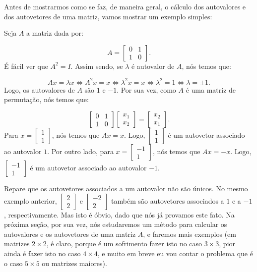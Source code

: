 Antes de mostrarmos como se faz, de maneira geral, o cálculo dos autovalores e dos autovetores de uma matriz, vamos mostrar um exemplo simples:

\begin{Example}
	Seja $A$ a matriz dada por:
	
	$$
	A = \begin{bmatrix}
		0 & 1 \\
		1 & 0
	\end{bmatrix}.
	$$
	É fácil ver que $A^2 = I$. Assim sendo, se $\lambda$ é autovalor de $A$, nós temos que:
	
	$$
	Ax = \lambda x \iff A^2x = x \iff \lambda^2 x = x \iff \lambda^2 = 1 \iff \lambda = \pm 1.
	$$
	Logo, os autovalores de $A$ são $1$ e $-1$. Por sua vez, como $A$ é uma matriz de permutação, nós temos que:
	
	$$
	\begin{bmatrix}
		0 & 1 \\
		1 & 0
	\end{bmatrix}\begin{bmatrix}
		x_1 \\
		x_2
	\end{bmatrix} = \begin{bmatrix}
		x_2 \\
		x_1
	\end{bmatrix}.
	$$
	Para $x = \begin{bmatrix}
		1 \\
		1
	\end{bmatrix}$, nós temos que $Ax = x$. Logo, $\begin{bmatrix}
		1 \\
		1
	\end{bmatrix}$ é um autovetor associado ao autovalor $1$. Por outro lado, para $x = \begin{bmatrix}
		-1 \\
		1
	\end{bmatrix}$, nós temos que $Ax = -x$. Logo, $\begin{bmatrix}
		-1 \\
		1
	\end{bmatrix}$ é um autovetor associado ao autovalor $-1$.
\end{Example}

Repare que os autovetores associados a um autovalor não são únicos. No mesmo exemplo anterior, $\begin{bmatrix}
	2 \\
	2
\end{bmatrix}$ e $\begin{bmatrix}
	-2 \\
	2
\end{bmatrix}$ também são autovetores associados a $1$ e a $-1$, respectivamente. Mas isto é óbvio, dado que nós já provamos este fato. Na próxima seção, por sua vez, nós estudaremos um método para calcular os autovalores e os autovetores de uma matriz $A$, e faremos mais exemplos (em matrizes $2\times 2$, é claro, porque é um sofrimento fazer isto no caso $3\times 3$, pior ainda é fazer isto no caso $4\times 4$, e muito em breve eu vou contar o problema que é o caso $5\times 5$ ou matrizes maiores).

